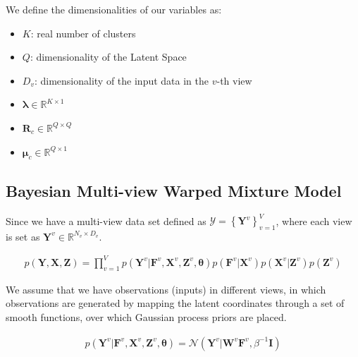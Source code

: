 \documentclass[]{article}
\newcommand{\gD}[2]{\mathcal{N}\left(#1,#2\right)}
\newcommand{\eye}{\mathbf{I}}
\newcommand{\setWv}{\mathbf{W}^{v}}
\newcommand{\setYv}{\mathbf{Y}^{v}}
\newcommand{\setXv}{\mathbf{X}^{v}}
\newcommand{\setZv}{\mathbf{Z}^{v}}
\newcommand{\setFv}{\mathbf{F}^{v}}
\newcommand{\hParams}{\boldsymbol{\theta}}
\begin{document}
We define the dimensionalities of our variables as:

\begin{itemize}
	\item 	$K$: real number of clusters
	\item $Q$:  dimensionality of the Latent Space
	\item $D_v$: dimensionality of the input data in the $v$-th view 
	\item $\boldsymbol{\lambda} \in \mathbb{R}^{K\times 1}$ 
	\item $\mathbf{R}_c \in \mathbb{R}^{Q\times Q}$
	\item $\boldsymbol{\mu}_c \in \mathbb{R}^{Q\times 1}$
\end{itemize}

\subsection{Bayesian Multi-view Warped Mixture Model}

Since we have a multi-view data set defined as $\mathcal{Y}=\left\{\mathbf{Y}^{v}\right\}_{v=1}^{V}$, where each view is set as $\mathbf{Y}^{v}\in \mathbb{R}^{N_v\times D_v}$. 


\begin{align}
p\left(\mathbf{Y},\mathbf{X},\mathbf{Z}\right) = \prod_{v=1}^{V}p\left(\setYv|\setFv,\setXv,\setZv,\hParams\right)p\left(\setFv|\setXv\right)p\left(\setXv|\setZv\right)p\left(\setZv\right)
\end{align}


We assume that we have observations (inputs) in different views, in which observations are generated by mapping the latent coordinates through a set of smooth functions, over which Gaussian process priors are placed.

\begin{align}
p\left(\setYv|\setFv,\setXv,\setZv,\hParams\right) = \gD{\setYv|\setWv\setFv}{\beta^{-1}\eye}
\end{align}





\end{document}
